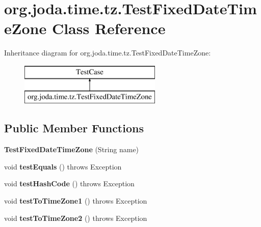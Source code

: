 \hypertarget{classorg_1_1joda_1_1time_1_1tz_1_1_test_fixed_date_time_zone}{\section{org.\-joda.\-time.\-tz.\-Test\-Fixed\-Date\-Time\-Zone Class Reference}
\label{classorg_1_1joda_1_1time_1_1tz_1_1_test_fixed_date_time_zone}
}
Inheritance diagram for org.\-joda.\-time.\-tz.\-Test\-Fixed\-Date\-Time\-Zone\-:\begin{figure}[H]
\begin{center}
\leavevmode
\includegraphics[height=2.000000cm]{classorg_1_1joda_1_1time_1_1tz_1_1_test_fixed_date_time_zone}
\end{center}
\end{figure}
\subsection*{Public Member Functions}
\begin{DoxyCompactItemize}
\item 
\hypertarget{classorg_1_1joda_1_1time_1_1tz_1_1_test_fixed_date_time_zone_a5806d79042d4e3b8589725caa988be2a}{{\bfseries Test\-Fixed\-Date\-Time\-Zone} (String name)}\label{classorg_1_1joda_1_1time_1_1tz_1_1_test_fixed_date_time_zone_a5806d79042d4e3b8589725caa988be2a}

\item 
\hypertarget{classorg_1_1joda_1_1time_1_1tz_1_1_test_fixed_date_time_zone_a0607b46805bad18d6f1ed9360fa37ac1}{void {\bfseries test\-Equals} ()  throws Exception }\label{classorg_1_1joda_1_1time_1_1tz_1_1_test_fixed_date_time_zone_a0607b46805bad18d6f1ed9360fa37ac1}

\item 
\hypertarget{classorg_1_1joda_1_1time_1_1tz_1_1_test_fixed_date_time_zone_a91f208432ce403acfd9f2a8a9ef00061}{void {\bfseries test\-Hash\-Code} ()  throws Exception }\label{classorg_1_1joda_1_1time_1_1tz_1_1_test_fixed_date_time_zone_a91f208432ce403acfd9f2a8a9ef00061}

\item 
\hypertarget{classorg_1_1joda_1_1time_1_1tz_1_1_test_fixed_date_time_zone_a4fd5d12232c3733b7957e1919b962674}{void {\bfseries test\-To\-Time\-Zone1} ()  throws Exception }\label{classorg_1_1joda_1_1time_1_1tz_1_1_test_fixed_date_time_zone_a4fd5d12232c3733b7957e1919b962674}

\item 
\hypertarget{classorg_1_1joda_1_1time_1_1tz_1_1_test_fixed_date_time_zone_a976f7a798d03dbefa6b09352568e31ca}{void {\bfseries test\-To\-Time\-Zone2} ()  throws Exception }\label{classorg_1_1joda_1_1time_1_1tz_1_1_test_fixed_date_time_zone_a976f7a798d03dbefa6b09352568e31ca}

\end{DoxyCompactItemize}

